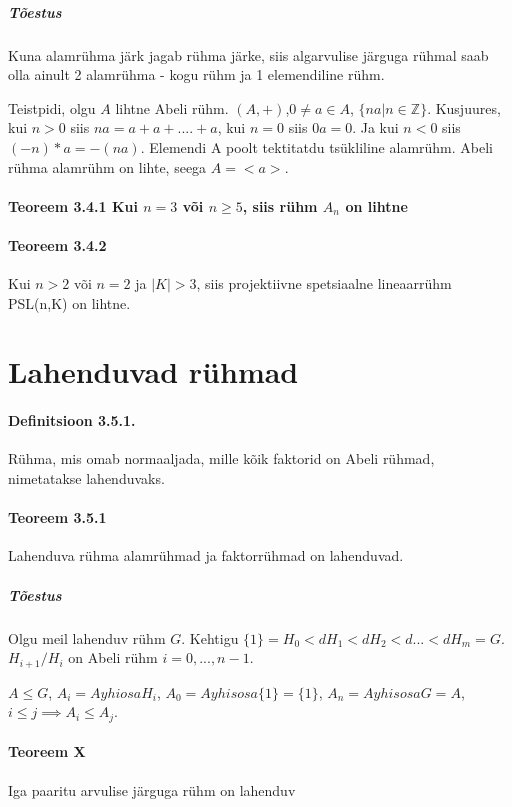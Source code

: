 \documentclass[12pt]{report}
\numberwithin{equation}{section}
\theoremstyle{definition}
\theoremstyle{plain}
\begin{document}
\subparagraph{Tõestus}
Kuna alamrühma järk jagab rühma järke, siis algarvulise järguga rühmal saab olla ainult 2 alamrühma - kogu rühm ja 1 elemendiline rühm.

Teistpidi, olgu $A$ lihtne Abeli rühm. $(A,+)$,$0 \neq a \in A$, $ \{na | n \in \mathbb{Z}\}$. Kusjuures, kui $n >0 $ siis $na = a + a + .... + a$, kui $n=0$ siis $0a = 0$. Ja kui $n < 0$ siis $(-n)*a = -(na)$. Elemendi A poolt tektitatdu ts\"ukliline alamr\"uhm. Abeli rühma alamr\"uhm on lihte, seega $A = < a >$. 

\paragraph{Teoreem 3.4.1 Kui $n = 3$ või $n \geq 5$, siis rühm $A_n$ on lihtne }
   
\paragraph{Teoreem 3.4.2} Kui $n > 2$ või $n=2$ ja $|K| > 3$, siis projektiivne spetsiaalne lineaarr\"uhm PSL(n,K) on lihtne. 

\section{Lahenduvad rühmad}

\paragraph{Definitsioon 3.5.1.} R\"uhma, mis omab normaaljada, mille kõik faktorid on Abeli rühmad, nimetatakse lahenduvaks.

\paragraph{Teoreem 3.5.1} Lahenduva r\"uhma alamrühmad ja faktorrühmad on lahenduvad.

\subparagraph{Tõestus} Olgu meil lahenduv rühm $G$. Kehtigu $\{1\} = H_0 <d H_1 <d H_2 <d ... <d H_m = G$. $H_{i+1}/H_i $ on Abeli rühm $i=0,...,n-1$. 

$A \leq G $, $ A_i = A yhiosa H_i$, $A_0 = A yhisosa \{1\} = \{1\}$, $A_n = A yhisosa G = A$, $i \leq j \implies A_i \leq A_j$. 

\paragraph{Teoreem X} Iga paaritu arvulise järguga rühm on lahenduv
\end{document}

